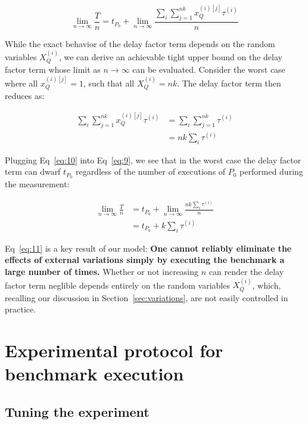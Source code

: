 \documentclass[conference]{IEEEtran}
\begin{document}
\begin{equation}  \label{eq:9}
    \lim_{n\to\infty} \frac{T}{n} = t_{P_0} + \lim_{n\to\infty} \frac{\sum_{i} \sum_{j=1}^{nk} x_Q^{(i)[j]} \tau^{(i)}}{n}
\end{equation}

While the exact behavior of the delay factor term depends on the random variables
$X_Q^{(i)}$, we can derive an achievable tight upper bound on the delay factor term whose
limit as $n \to \infty$ can be evaluated. Consider the worst case where all $x_Q^{(i)[j]} =
1$, such that all $X_Q^{(i)} = nk$. The delay factor term then reduces as:

\begin{align} \label{eq:10}
    \sum_{i} \sum_{j=1}^{nk} x_Q^{(i)[j]} \tau^{(i)} &= \sum_{i} \sum_{j=1}^{nk} \tau^{(i)} \\ \nonumber
                                                     &= nk \sum_{i} \tau^{(i)}
\end{align}

Plugging Eq~\ref{eq:10} into Eq~\ref{eq:9}, we see that in the worst case the delay factor
term can dwarf $t_{P_0}$ regardless of the number of executions of $P_0$ performed during
the measurement:

\begin{align} \label{eq:11}
    \lim_{n\to\infty} \frac{T}{n} &= t_{P_0} + \lim_{n\to\infty} \frac{nk \sum_{i} \tau^{(i)}}{n} \\ \nonumber
                                  &= t_{P_0} + k \sum_{i} \tau^{(i)}
\end{align}

Eq~\ref{eq:11} is a key result of our model: \textbf{One cannot reliably eliminate the
effects of external variations simply by executing the benchmark a large number of times.}
Whether or not increasing $n$ can render the delay factor term neglible depends entirely on
the random variables $X_Q^{(i)}$, which, recalling our discussion in
Section~\ref{sec:variations}, are not easily controlled in practice.

\label{sec:protocol}
\section{Experimental protocol for benchmark execution}

\subsection{Tuning the experiment}
\end{document}
